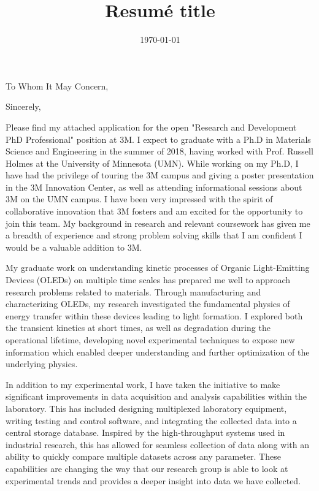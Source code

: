 \documentclass[11pt,a4paper,roman]{moderncv}        %
\title{Resumé title}                               %
\newcommand{\company}{3M}
\newcommand{\shortcompany}{3M}
\begin{document}
\date{\today}
\opening{To Whom It May Concern,}
\closing{Sincerely,}
\makelettertitle
\justify
Please find my attached application for the open "Research and Development PhD Professional" position at \company{}.
I expect to graduate with a Ph.D in Materials Science and Engineering in the summer of 2018, having worked with Prof. Russell Holmes at the University of Minnesota (UMN).
While working on my Ph.D, I have had the privilege of touring the \shortcompany{}  campus and giving a poster presentation in the 3M  Innovation Center, as well as attending informational sessions about \company{} on the UMN campus.
I have been very impressed with the spirit of collaborative innovation that \company{} fosters and am excited for the opportunity to join this team.
My background in research and relevant coursework has given me a breadth of experience and strong problem solving skills that I am confident I would be a valuable addition to \company{}.

My graduate work on understanding kinetic processes of Organic Light-Emitting Devices (OLEDs) on multiple time scales has prepared me well to approach research problems related to materials.
Through manufacturing and characterizing OLEDs, my research investigated the fundamental physics of energy transfer within these devices leading to light formation.
I explored both the transient kinetics at short times, as well as degradation during the operational lifetime, developing novel experimental techniques to expose new information which enabled deeper understanding and further optimization of the underlying physics. 

In addition to my experimental work, I have taken the initiative to make significant improvements in data acquisition and analysis capabilities within the laboratory.
This has included designing multiplexed laboratory equipment, writing testing and control software, and integrating the collected data into a central storage database.
Inspired by the high-throughput systems used in industrial research, this has allowed for seamless collection of data along with an ability to quickly compare multiple datasets across any parameter. 
These capabilities are changing the way that our research group is able to look at experimental trends and provides a deeper insight into data we have collected.
\end{document}
